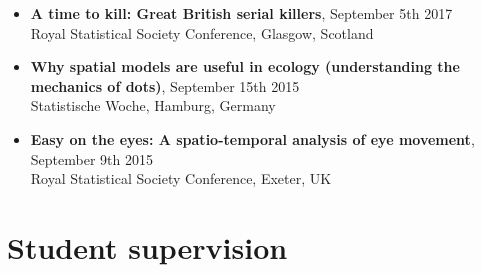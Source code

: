 \documentclass[10pt,a4paper]{moderncv}
\begin{document}
\begin{itemize}
    
    
    
    \item \textbf{A time to kill: Great British serial killers}, September 5th 2017\\
    { Royal Statistical Society Conference, Glasgow, Scotland}
    
    \item \textbf{Why spatial models are useful in ecology (understanding the mechanics of dots)}, September 15th 2015\\
    { Statistische Woche, Hamburg, Germany}
    
    \item \textbf{Easy on the eyes: A spatio-temporal analysis of eye movement}, September 9th 2015\\
    { Royal Statistical Society Conference, Exeter, UK}
    
    
\end{itemize}


\section{Student supervision}

\vspace{6pt}
\end{document}
